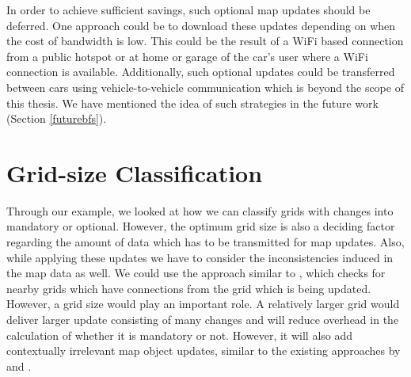 In order to achieve sufficient savings, such optional map updates should be deferred. One approach could be to download these updates depending on when the cost of bandwidth is low. This could be the result of a WiFi based connection from a public hotspot or at home or garage of the car's user where a WiFi connection is available. Additionally, such optional updates could be transferred between cars using vehicle-to-vehicle communication which is beyond the scope of this thesis. We have mentioned the idea of such strategies in the future work (Section \ref{futurebfs}).
\section{Grid-size Classification} \label{gridsizeclassification}
Through our example, we looked at how we can classify grids with changes into mandatory or optional. However, the optimum grid size is also a deciding factor regarding the amount of data which has to be transmitted for map updates. Also, while applying these updates we have to consider the inconsistencies induced in the map data as well. We could use the approach similar to \citet{asahara2008locally}, which checks for nearby grids which have connections from the grid which is being updated. However, a grid size would play an important role. A relatively larger grid would deliver larger update consisting of many changes and will reduce overhead in the calculation of whether it is mandatory or not. However, it will also add contextually irrelevant map object updates, similar to the existing approaches by \cite{min2011system} and \cite{bastiaensen2003actmap}. \\

